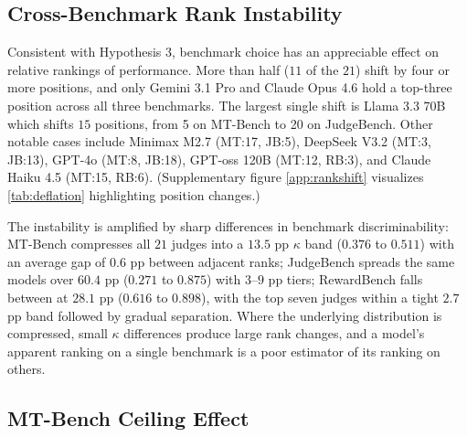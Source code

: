 \documentclass[11pt]{article}
\begin{document}

\subsection{Cross-Benchmark Rank Instability}

Consistent with Hypothesis 3, benchmark choice has an appreciable effect on relative rankings of performance. More than half ($11$ of the $21$) shift by four or more positions, and only Gemini 3.1 Pro and Claude Opus 4.6 hold a top-three position across all three benchmarks. The largest single shift is Llama 3.3 70B which shifts $15$ positions, from 5 on MT-Bench to 20 on JudgeBench. Other notable cases include 
Minimax M2.7 (MT:17, JB:5), 
DeepSeek V3.2 (MT:3, JB:13), 
GPT-4o (MT:8, JB:18), 
GPT-oss 120B (MT:12,  RB:3), and 
Claude Haiku 4.5 (MT:15, RB:6).  
(Supplementary figure \autoref{app:rankshift} visualizes \autoref{tab:deflation} highlighting position changes.) 

The instability is amplified by sharp differences in benchmark discriminability: MT-Bench compresses all $21$ judges into a $13.5$ pp $\kappa$ band ($0.376$ to $0.511$) with an average gap of $0.6$ pp between adjacent ranks; JudgeBench spreads the same models over $60.4$ pp ($0.271$ to $0.875$) with $3$--$9$ pp tiers; RewardBench falls between at $28.1$ pp ($0.616$ to $0.898$), with the top seven judges within a tight $2.7$ pp band followed by gradual separation. Where the underlying distribution is compressed, small $\kappa$ differences produce large rank changes, and a model's apparent ranking on a single benchmark is a poor estimator of its ranking on others.


\subsection{MT-Bench Ceiling Effect}
\end{document}
